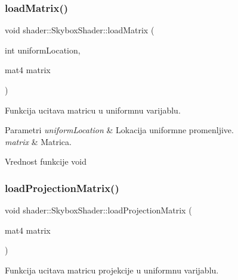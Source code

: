 \mbox{\label{classshader_1_1SkyboxShader_aa393967943968af99c1eab26f510f856}} 
\subsubsection{\texorpdfstring{load\+Matrix()}{loadMatrix()}}
{\footnotesize\ttfamily void shader\+::\+Skybox\+Shader\+::load\+Matrix (\begin{DoxyParamCaption}\item[{int}]{uniform\+Location,  }\item[{mat4}]{matrix }\end{DoxyParamCaption})}



Funkcija ucitava matricu u uniformnu varijablu. 


\begin{DoxyParams}{Parametri}
{\em uniform\+Location} & Lokacija uniformne promenljive. \\
\hline
{\em matrix} & Matrica. \\
\hline
\end{DoxyParams}
\begin{DoxyReturn}{Vrednost funkcije}
void 
\end{DoxyReturn}
\mbox{\label{classshader_1_1SkyboxShader_a6535b40978fc4a7bbe2b26b20f4b55c4}} 
\subsubsection{\texorpdfstring{load\+Projection\+Matrix()}{loadProjectionMatrix()}}
{\footnotesize\ttfamily void shader\+::\+Skybox\+Shader\+::load\+Projection\+Matrix (\begin{DoxyParamCaption}\item[{mat4}]{matrix }\end{DoxyParamCaption})}



Funkcija ucitava matricu projekcije u uniformnu varijablu. 


